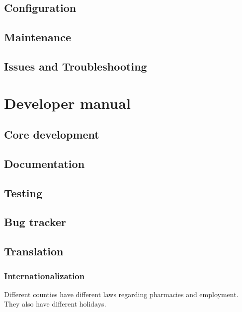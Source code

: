 \documentclass[12pt,a4paper,titlepage]{book}
\begin{document}
\section{Configuration}
\section{Maintenance}
\section{Issues and Troubleshooting}


\chapter{Developer manual}
\section{Core development}
\section{Documentation}
\section{Testing}
\section{Bug tracker}
\section{Translation}
\subsection{Internationalization}
Different counties have different laws regarding pharmacies and employment. They also have different holidays.
\end{document}
